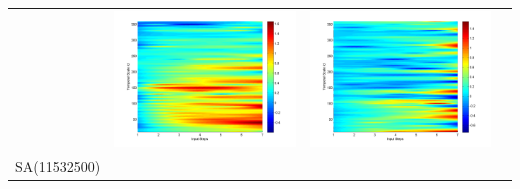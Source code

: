 \documentclass[11pt]{article}
\begin{document}
\begin{table}[H]
{\begin{tabular}{cccc}
&\begin{minipage}{.3\textwidth}\includegraphics[width=\linewidth]{resultgraph/05585000diff_ep.png}\end{minipage}
&\begin{minipage}{.3\textwidth}\includegraphics[width=\linewidth]{resultgraph/05585000diff_q.png}\end{minipage}
\\
SA(11532500)

\end{tabular}}
\end{table}
\end{document}
